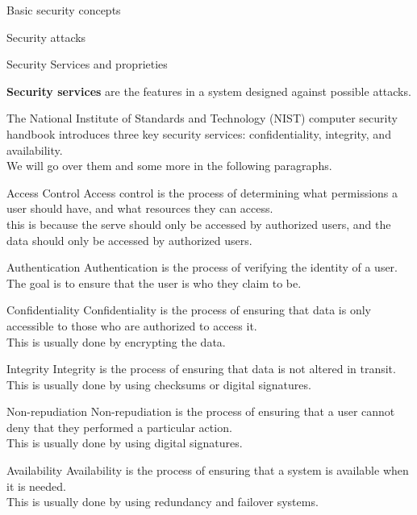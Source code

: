 \begin{section}{Basic security concepts}
\begin{subsection}{Security attacks}
  \end{subsection}
  \begin{subsection}{Security Services and proprieties}
    \begin{boxH}
      \textbf{Security services} are the features in a system designed against possible attacks.
    \end{boxH}
    The National Institute of Standards and Technology (NIST) computer security handbook introduces 
    three key security services: confidentiality, integrity, and availability.\\
    We will go over them and some more in the following paragraphs.
    \begin{paragraph}{Access Control}
      Access control is the process of determining what permissions a user should have, and what 
      resources they can access.\\
      this is because the serve should only be accessed by authorized users, and the data should only
      be accessed by authorized users.
    \end{paragraph}
    \begin{paragraph}{Authentication}
      Authentication is the process of verifying the identity of a user.\\
      The goal is to ensure that the user is who they claim to be.
    \end{paragraph}
    \begin{paragraph}{Confidentiality}
      Confidentiality is the process of ensuring that data is only accessible to those who are authorized
      to access it.\\
      This is usually done by encrypting the data.
    \end{paragraph}
    \begin{paragraph}{Integrity}
      Integrity is the process of ensuring that data is not altered in transit.\\
      This is usually done by using checksums or digital signatures.
    \end{paragraph}
    \begin{paragraph}{Non-repudiation}
      Non-repudiation is the process of ensuring that a user cannot deny that they performed a 
      particular action.\\
      This is usually done by using digital signatures.
    \end{paragraph}
    \begin{paragraph}{Availability}
      Availability is the process of ensuring that a system is available when it is needed.\\
      This is usually done by using redundancy and failover systems.
    \end{paragraph}


\end{subsection}
\end{section}
